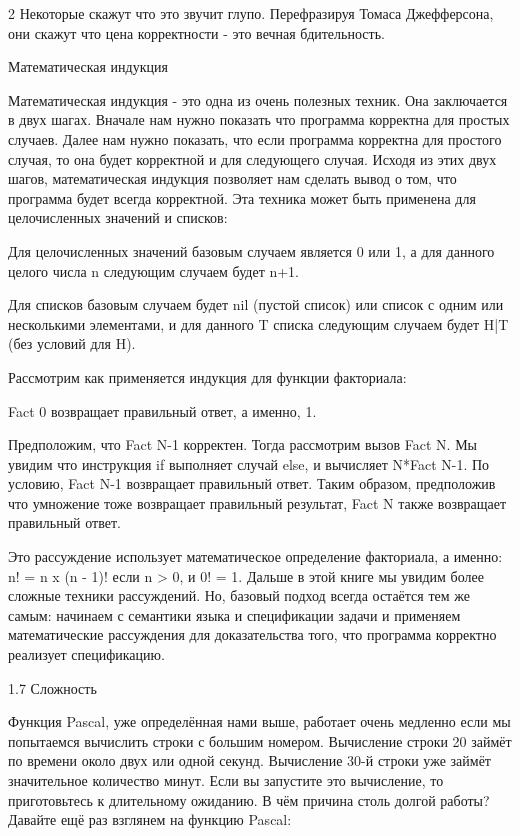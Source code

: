 2 Некоторые скажут что это звучит глупо. Перефразируя Томаса Джефферсона, они скажут что цена корректности - это вечная бдительность.

Математическая индукция

Математическая индукция - это одна из очень полезных техник. Она заключается в двух шагах. Вначале нам нужно показать что программа корректна для простых случаев. Далее нам нужно показать, что если программа корректна для простого случая, то она будет корректной и для следующего случая. Исходя из этих двух шагов, математическая индукция позволяет нам сделать вывод о том, что программа будет всегда корректной. Эта техника может быть применена для целочисленных значений и списков:

Для целочисленных значений базовым случаем является 0 или 1, а для данного целого числа n следующим случаем будет n+1.

Для списков базовым случаем будет nil (пустой список) или список с одним или несколькими элементами, и для данного T списка следующим случаем будет H|T (без условий для H).

Рассмотрим как применяется индукция для функции факториала:

{Fact 0} возвращает правильный ответ, а именно, 1.

Предположим, что {Fact N-1} корректен. Тогда рассмотрим вызов {Fact N}. Мы увидим что инструкция if выполняет случай else, и вычисляет N*{Fact N-1}. По условию, {Fact N-1} возвращает правильный ответ. Таким образом, предположив что умножение тоже возвращает правильный результат, {Fact N} также возвращает правильный ответ.

Это рассуждение использует математическое определение факториала, а именно: n! = n x (n - 1)! если n > 0, и 0! = 1. Дальше в этой книге мы увидим более сложные техники рассуждений. Но, базовый подход всегда остаётся тем же самым: начинаем с семантики языка и спецификации задачи и применяем математические рассуждения для доказательства того, что программа корректно реализует спецификацию.

1.7 Сложность

Функция Pascal, уже определённая нами выше, работает очень медленно если мы попытаемся вычислить строки с большим номером. Вычисление строки 20 займёт по времени около двух или одной секунд. Вычисление 30-й строки уже займёт значительное количество минут. Если вы запустите это вычисление, то приготовьтесь к длительному ожиданию. В чём причина столь долгой работы? Давайте ещё раз взглянем на функцию Pascal:


